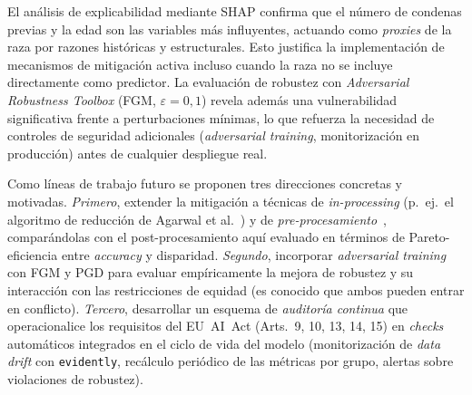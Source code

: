 \documentclass[11pt,a4paper]{article}
\begin{document}
El análisis de explicabilidad mediante SHAP confirma que el número de condenas previas y la edad son las variables más influyentes, actuando como \textit{proxies} de la raza por razones históricas y estructurales. Esto justifica la implementación de mecanismos de mitigación activa incluso cuando la raza no se incluye directamente como predictor. La evaluación de robustez con \textit{Adversarial Robustness Toolbox} (FGM, $\varepsilon=0{,}1$) revela además una vulnerabilidad significativa frente a perturbaciones mínimas, lo que refuerza la necesidad de controles de seguridad adicionales (\textit{adversarial training}, monitorización en producción) antes de cualquier despliegue real.

Como líneas de trabajo futuro se proponen tres direcciones concretas y motivadas. \emph{Primero}, extender la mitigación a técnicas de \emph{in-processing} (p.\ ej.\ el algoritmo de reducción de Agarwal et al.~\cite{agarwal2018reductions}) y de \emph{pre-procesamiento}~\cite{calmon2017optimized}, comparándolas con el post-procesamiento aquí evaluado en términos de Pareto-eficiencia entre \textit{accuracy} y disparidad. \emph{Segundo}, incorporar \textit{adversarial training} con FGM y PGD para evaluar empíricamente la mejora de robustez y su interacción con las restricciones de equidad (es conocido que ambos pueden entrar en conflicto). \emph{Tercero}, desarrollar un esquema de \emph{auditoría continua} que operacionalice los requisitos del EU~AI~Act (Arts.~9, 10, 13, 14, 15) en \textit{checks} automáticos integrados en el ciclo de vida del modelo (monitorización de \textit{data drift} con \texttt{evidently}, recálculo periódico de las métricas por grupo, alertas sobre violaciones de robustez).


\end{document}
